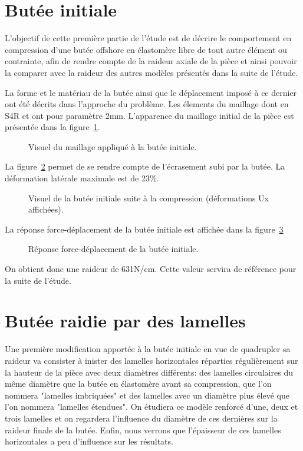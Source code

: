 ﻿\documentclass{article}
\begin{document}
\section{Butée initiale}

L'objectif de cette première partie de l'étude est de décrire le comportement en compression d'une butée offshore en élastomère libre de tout autre élément ou contrainte, afin de rendre compte de la raideur axiale de la pièce et ainsi pouvoir la comparer avec la raideur des autres modèles présentés dans la suite de l'étude.

La forme et le matériau de la butée ainsi que le déplacement imposé à ce dernier ont été décrits dans l'approche du problème. Les élements du maillage dont en S4R et ont pour paramètre 2mm. L'apparence du maillage initial de la pièce est présentée dans la figure~\ref{fig3}.

\begin{figure}[!h]
	\centering
	\caption{Visuel du maillage appliqué à la butée initiale.}
	\label{fig3}
\end{figure}

La figure~\ref{fig4} permet de se rendre compte de l'écrasement subi par la butée. La déformation latérale maximale est de 23\%.

\begin{figure}[!h]
	\centering
	\caption{Visuel de la butée initiale suite à la compression (déformations Ux affichées).}
	\label{fig4}
\end{figure}

La réponse force-déplacement de la butée initiale est affichée dans la figure~\ref{fig5}

\begin{figure}[!h]
	\centering
	\caption{Réponse force-déplacement de la butée initiale.}
	\label{fig5}
\end{figure}

On obtient donc une raideur de 631N/cm. Cette valeur servira de référence pour la suite de l'étude.


\section{Butée raidie par des lamelles}

Une première modification apportée à la butée initiale en vue de quadrupler sa raideur va consister à inister des lamelles horizontales réparties régulièrement sur la hauteur de la pièce avec deux diamètres différents: des lamelles circulaires du même diamètre que la butée en élastomère avant sa compression, que l'on nommera "lamelles imbriquées" et des lamelles avec un diamètre plus élevé que l'on nommera "lamelles étendues". On étudiera ce modèle renforcé d'une, deux et trois lamelles et on regardera l'influence du diamètre de ces dernières sur la raideur finale de la butée. Enfin, nous verrons que l'épaisseur de ces lamelles horizontales a peu d'influence sur les résultats.
\end{document}
